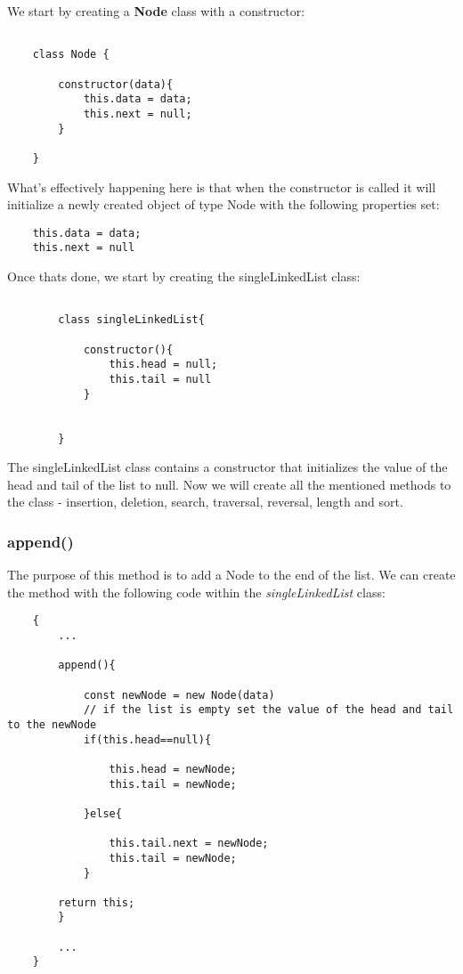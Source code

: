 \documentclass{article}
\begin{document}
We start by creating a \textbf{Node} class with a constructor:

\begin{verbatim}
    
    class Node {

        constructor(data){
            this.data = data;
            this.next = null;
        }

    }

\end{verbatim}
What's effectively happening here is that when the constructor is called it will initialize a newly created object of type Node with the following properties set: 
\begin{verbatim}
    this.data = data;
    this.next = null
\end{verbatim}


Once thats done, we start by creating the singleLinkedList class:

\begin{verbatim}
    
        class singleLinkedList{

            constructor(){
                this.head = null;
                this.tail = null
            }


        }
\end{verbatim}

The singleLinkedList class contains a constructor that initializes the value of the head and tail of the list to null. Now we will create all the mentioned methods to the class - insertion, deletion, search, traversal, reversal, length and sort.
\newpage
\subsubsection{append()}

The purpose of this method is to add a Node to the end of the list. We can create the method with the following code within the \textit{singleLinkedList} class:

\begin{verbatim}
    {
        ...

        append(){

            const newNode = new Node(data)
            // if the list is empty set the value of the head and tail to the newNode
            if(this.head==null){

                this.head = newNode;
                this.tail = newNode;

            }else{

                this.tail.next = newNode;
                this.tail = newNode;
            }

        return this;
        }

        ...
    }
\end{verbatim}
\end{document}
